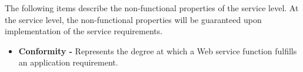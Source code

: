 


The following items describe the non-functional properties of the service level.
At the service level, the non-functional properties will be guaranteed upon
implementation of the service requirements.
  
\begin{itemize} 

  \item \textbf{Conformity -} Represents the degree at which a Web service
  function fulfills an application requirement.  
  

\end{itemize}
